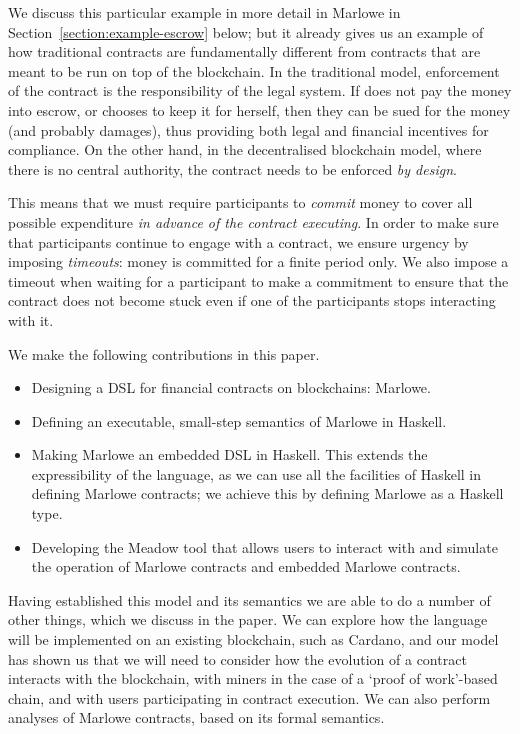 \documentclass[runningheads]{llncs}
\begin{document}
We discuss this particular example in more detail in Marlowe in Section~\ref{section:example-escrow} below; but it 
already gives us an example of how traditional contracts are fundamentally different from contracts that are meant to 
be run on top of the blockchain. In the traditional model, enforcement of the contract is the responsibility of the 
legal system. If  does not pay the money into escrow, or  chooses to keep it 
for herself, then they can be sued for the money (and probably damages), thus providing both legal and financial 
incentives for compliance. On the other hand, in the decentralised blockchain model, where there is no central 
authority, the contract needs to be enforced \emph{by design}.

This means that we must require participants to \emph{commit} money to cover all possible expenditure \emph{in advance 
of the contract executing}. In order to make sure that participants continue to engage with a contract, we ensure 
urgency by imposing \emph{timeouts}: money is committed for a finite period only. We also impose a timeout when waiting 
for a participant to make a commitment to ensure that the contract does not become stuck even if one of the participants 
stops interacting with it.

We make the following contributions in this paper.
\begin{itemize}
\item
Designing a DSL for financial contracts on blockchains: Marlowe.
\item
Defining an executable, small-step semantics of Marlowe in Haskell.
\item 
Making Marlowe an embedded DSL in Haskell. This extends the expressibility of the language, as we can use all the 
facilities of Haskell in defining Marlowe contracts; we achieve this by defining Marlowe as  a Haskell 
 type.
\item
Developing the Meadow tool that allows users to interact with and simulate the operation of Marlowe contracts 
and embedded Marlowe contracts.
\end{itemize}

Having established this model and its semantics we are able to do a number of other things, which we discuss in the 
paper. We can explore how the language will be implemented on an existing blockchain, such as Cardano, and our model has 
shown us that we will need to consider how the evolution of a contract interacts with the blockchain, with miners in the 
case of a `proof of work'-based chain, and with users participating in contract execution. We can also perform analyses 
of Marlowe contracts, based on its formal semantics. 
\end{document}
